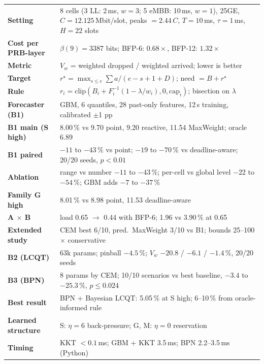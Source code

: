 \documentclass[11pt,a4paper]{article}
\newcommand{\rstar}{r^\star}
\begin{document}
\begin{center}
\renewcommand{\arraystretch}{1.2}
\begin{tabularx}{\linewidth}{>{\raggedright\arraybackslash}p{5.2cm}X}
\toprule
\textbf{Setting} & 8 cells (3 LL: 2\,ms, $w{=}3$; 5 eMBB: 10\,ms, $w{=}1$), 25GE, $C = 12.125$\,Mbit/slot, peaks $= 2.44\,C$, $T = 10$\,ms, $\tau = 1$\,ms, $H = 22$ slots \\
\textbf{Cost per PRB-layer} & $\beta(9) = 3387$ bits; BFP-6: $0.68\times$, BFP-12: $1.32\times$ \\
\textbf{Metric} & $V_w$ = weighted dropped / weighted arrived; lower is better \\
\textbf{Target} & $\rstar = \max_{s\le e}\sum a/(e-s+1+D)$; need $= B + \rstar$ \\
\textbf{Rule} & $r_i = \mathrm{clip}(B_i + F_i^{-1}(1 - \lambda/w_i), 0, \mathrm{cap}_i)$; bisection on $\lambda$ \\
\textbf{Forecaster (B1)} & GBM, 6 quantiles, 28 past-only features, 12\,s training, calibrated $\pm$1 pp \\
\textbf{B1 main (S high)} & 8.00\,\% vs 9.70 point, 9.20 reactive, 11.54 MaxWeight; oracle 6.89 \\
\textbf{B1 paired} & $-11$ to $-43\,\%$ vs point; $-19$ to $-70\,\%$ vs deadline-aware; 20/20 seeds, $p<0.01$ \\
\textbf{Ablation} & range vs number $-11$ to $-43\,\%$; per-cell vs global level $-22$ to $-54\,\%$; GBM adds $-7$ to $-37\,\%$ \\
\textbf{Family G high} & 8.01\,\% vs 8.98 point, 11.53 deadline-aware \\
\textbf{A $\times$ B} & load 0.65 $\to$ 0.44 with BFP-6; 1.96 vs 3.90\,\% at 0.65 \\
\textbf{Extended study} & CEM best 6/10, pred.\ MaxWeight 3/10 vs B1; bounds 25--100$\times$ conservative \\
\textbf{B2 (LCQT)} & 63k params; pinball $-4.5\,\%$; $V_w$ $-20.8$ / $-6.1$ / $-1.4\,\%$, 20/20 seeds \\
\textbf{B3 (BPN)} & 8 params by CEM; 10/10 scenarios vs best baseline, $-3.4$ to $-25.3\,\%$, $p\le0.024$ \\
\textbf{Best result} & BPN + Bayesian LCQT: 5.05\,\% at S high; 6--10\,\% from oracle-informed rule \\
\textbf{Learned structure} & S: $\eta = 6$ back-pressure; G, M: $\eta = 0$ reservation \\
\textbf{Timing} & KKT $<0.1$\,ms; GBM + KKT 3.5\,ms; BPN 2.2--3.5\,ms (Python) \\
\bottomrule
\end{tabularx}
\end{center}
\end{document}
